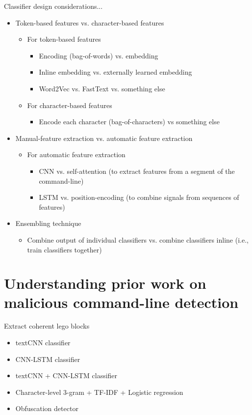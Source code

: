 \documentclass[10pt]{beamer}
\begin{document}
\begin{frame}{Classifier design considerations...}
	\begin{itemize}
		\item Token-based features vs. character-based features
		\begin{itemize}
			\item For token-based features
			\begin{itemize}
				\item Encoding (bag-of-words) vs. embedding
				\item Inline embedding vs. externally learned embedding
				\item Word2Vec vs. FastText vs. something else
			\end{itemize}
			\item For character-based features
			\begin{itemize}
				\item Encode each character (bag-of-characters) vs something else
			\end{itemize}
		\end{itemize}
		\item Manual-feature extraction vs. automatic feature extraction
		\begin{itemize}
			\item For automatic feature extraction
			\begin{itemize}
				\item CNN vs. self-attention (to extract features from a segment of the command-line)
				\item LSTM vs. position-encoding (to combine signals from sequences of features)
			\end{itemize}
		\end{itemize}
		\item Ensembling technique
		\begin{itemize}
			\item Combine output of individual classifiers vs. combine classifiers inline (i.e., train classifiers together)
		\end{itemize}
	\end{itemize}
\end{frame}

\section{Understanding prior work on malicious command-line detection}

\begin{frame}[fragile]{Extract coherent lego blocks}
	\begin{itemize}
		\item textCNN classifier \cite{textcnn2016,textcnn2019,powershell2018}
		\item CNN-LSTM classifier \cite{amsi2019}
		\item textCNN + CNN-LSTM classifier \cite{amsi2019}
		\item Character-level 3-gram + TF-IDF + Logistic regression \cite{amsi2019}
		\item Obfuscation detector \cite{feye2018}
	\end{itemize}
\end{frame}
\end{document}
